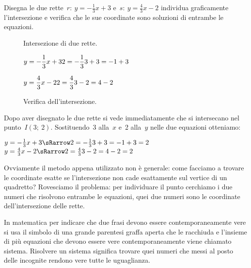 \begin{exrig}
 \begin{esempio}
  Disegna le due rette~$r:~y = -\frac{1}{3} x +3$ e~$s:~y = \frac{4}{3} x -2$ 
  individua graficamente l'intersezione e verifica che 
  le sue coordinate sono soluzioni di entrambe le equazioni.
\begin{inaccessibleblock}
 \begin{figure}[h]
 \centering
 \begin{minipage}[]{.60\textwidth}
   \centering
  \caption{Intersezione di due rette.}\label{fig:intersezione01}
 \end{minipage}
 \begin{minipage}[]{.30\textwidth}
  \begin{center}

   $y = -\dfrac{1}{3} x +3 \newline
    2 = -\dfrac{1}{3} 3 +3 = -1 + 3$
   
   $y = \dfrac{4}{3} x -2 \newline
    2 = \dfrac{4}{3} 3 -2 = 4 -2$

  \end{center}
  \caption{Verifica dell'intersezione.}\label{fig:elementi}
 \end{minipage}
\end{figure}
\end{inaccessibleblock}
 \end{esempio}
 
\vspace{-12pt}

Dopo aver disegnato le due rette si vede immediatamente che si intersecano 
nel punto~$I(3;~2)$. Sostituendo~3 alla~$x$ e~2 
alla~$y$ nelle due equazioni otteniamo:

$y = -\frac{1}{3} x +3 \sRarrow
2 = -\frac{1}{3} 3 +3 = -1 + 3 = 2$
\qquad
$y = \frac{4}{3} x -2 \sRarrow
2 = \frac{4}{3} 3 -2 = 4 -2 = 2$
   
Ovviamente il metodo appena utilizzato non è generale: come facciamo a trovare 
le coordinate esatte se l'intersezione non cade esattamente sul vertice di  
un quadretto? Rovesciamo il problema: per individuare il punto 
cerchiamo i due numeri che risolvono entrambe le equazioni, quei due numeri
sono le coordinate dell'intersezione delle rette.

In matematica per indicare che due frasi devono essere contemporaneamente 
vere si usa il simbolo di una grande parentesi graffa aperta che le racchiuda 
e l'insieme di più equazioni che devono essere vere contemporaneamente viene
chiamato sistema. Risolvere un sistema significa trovare quei numeri che 
messi al posto delle incognite rendono vere tutte le uguaglianza.


\end{exrig}
